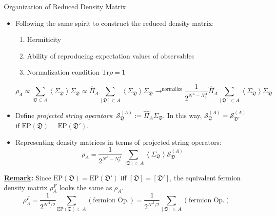 \documentclass[professionalfont,
                xcolor=dvipsnames]{beamer}
\newcommand{\anglelr}[1]{\left\langle #1 \right\rangle}
\newcommand{\lr}[1]{\left(#1\right)}
\newcommand{\mrm}[1]{\mathrm{#1}}
\newcommand{\tr}{\mrm{Tr}}
\begin{document}
\begin{frame}{Organization of Reduced Density Matrix}
    \begin{itemize}
        \item Following the same spirit to construct the reduced density matrix: 
        \begin{enumerate}
            \item [(i)] Hermiticity
            \item [(ii)] Ability of reproducing expectation values of observables
            \item [(iii)] Normalization condition $\tr \rho =1$
        \end{enumerate}
        \[
        \rho_A \propto \sum_{\mathfrak{D}\subset A}\anglelr{\Sigma_{\mathfrak{D}}}\Sigma_{\mathfrak{D}} \propto \hat{\Pi}_A\sum_{[\mathfrak{D}]\subset A}\anglelr{\Sigma_\mathfrak{D}}\Sigma_{\mathfrak{D}} 
        \mathop{\longrightarrow}^{\text{normalize}}
        \boxed{
            \frac{1}{2^{N^A-N^A_p}} \hat{\Pi}_A \sum_{[\mathfrak{D}]\subset A} \anglelr{\Sigma_\mathfrak{D}} \Sigma_{\mathfrak{D}} 
        }
        \]
        \item Define \textit{projected string operators}: $\mathcal{S}_\mathfrak{D}^{(A)} := \hat{\Pi}_A\Sigma_\mathfrak{D}$. In this way, $\mathcal{S}_\mathfrak{D}^{(A)} = \mathcal{S}_\mathfrak{D'}^{(A)}$ if $\mrm{EP}(\mathfrak{D}) = \mrm{EP}(\mathfrak{D}')$.
        \item Representing density matrices in terms of projected string operators:
        \[
        \boxed{
            \rho _A 
            =
            \frac{1}{2^{N^A - N^A_p}}\sum_{[\mathfrak{D}]\subset A}\anglelr{\Sigma_\mathfrak{D}}\mathcal{S}_{\mathfrak{D}}^{(A)}
        }
        \]
    \end{itemize}
{\small \textbf{\underline{Remark}:}} Since $\mrm{EP(\mathfrak{D})} = \mrm{EP}(\mathfrak{D}')$ iff $[\mathfrak{D}] = [\mathfrak{D}']$, the equivalent fermion density matrix $\rho_A^F$ looks the same as $\rho_A$. 
\[
\rho_A^F = \frac{1}{2^{N^A/2}}\sum_{\mrm{EP}(\mathfrak{D})\subset A}\lr{\text{fermion Op.}} = \frac{1}{2^{N^A/2}}\sum_{[\mathfrak{D}]\subset A}\lr{\text{fermion Op.}}
\]
\end{frame}
\end{document}
